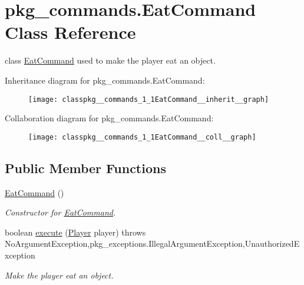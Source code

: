 \hypertarget{classpkg__commands_1_1EatCommand}{\section{pkg\-\_\-commands.\-Eat\-Command Class Reference}
\label{classpkg__commands_1_1EatCommand}
}


class \hyperlink{classpkg__commands_1_1EatCommand}{Eat\-Command} used to make the player eat an object.  




Inheritance diagram for pkg\-\_\-commands.\-Eat\-Command\-:\nopagebreak
\begin{figure}[H]
\begin{center}
\leavevmode
\texttt{[image: classpkg\_\_commands\_1\_1EatCommand\_\_inherit\_\_graph]}
\end{center}
\end{figure}


Collaboration diagram for pkg\-\_\-commands.\-Eat\-Command\-:\nopagebreak
\begin{figure}[H]
\begin{center}
\leavevmode
\texttt{[image: classpkg\_\_commands\_1\_1EatCommand\_\_coll\_\_graph]}
\end{center}
\end{figure}
\subsection*{Public Member Functions}
\begin{DoxyCompactItemize}
\item 
\hyperlink{classpkg__commands_1_1EatCommand_ad83dfae54a7d24140beff2b00201e065}{Eat\-Command} ()
\begin{DoxyCompactList}\small\item\em Constructor for \hyperlink{classpkg__commands_1_1EatCommand}{Eat\-Command}. \end{DoxyCompactList}\item 
boolean \hyperlink{classpkg__commands_1_1EatCommand_a2a600f09891aa076b3f630293de965f4}{execute} (\hyperlink{classpkg__world_1_1Player}{Player} player)  throws No\-Argument\-Exception,pkg\-\_\-exceptions.\-Illegal\-Argument\-Exception,\-Unauthorized\-Exception 
\begin{DoxyCompactList}\small\item\em Make the player eat an object. \end{DoxyCompactList}\end{DoxyCompactItemize}
